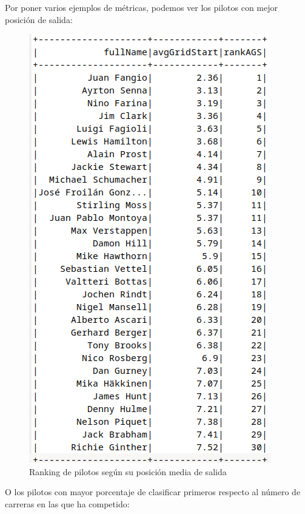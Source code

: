 \documentclass[12pt,twoside,titlepage]{report}
\begin{document}
Por poner varios ejemplos de métricas, podemos ver los pilotos con mejor posición de salida:

\begin{figure}[H]
	\includegraphics[scale=0.3]{results/bestdrivers/avggridstart.png}
	\centering
	\caption{Ranking de pilotos según su posición media de salida}
	\label{fig:avgGridStart}
	\centering
\end{figure}

O los pilotos con mayor porcentaje de clasificar primeros respecto al número de carreras en las que ha competido:
\end{document}
